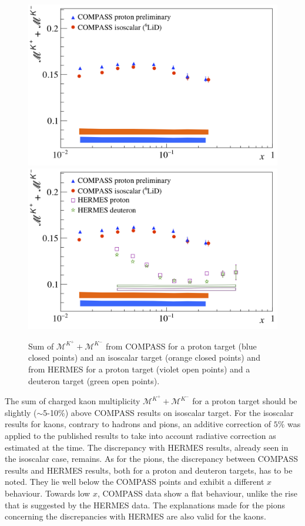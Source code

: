 \begin{figure}[!h]
  \centering
	\includegraphics[scale=0.5]{./gfx/Ks_noH.png}
  \includegraphics[scale=0.5]{./gfx/Ks.png}
  \caption{Sum of $\mathscr{M}^{K^+}+\mathscr{M}^{K^-}$ from COMPASS for a proton target (blue closed points) and an isoscalar target (orange closed points) and from HERMES for a proton target (violet open points) and a deuteron target (green open points).}
  \label{pic:ksum}
\end{figure}

The sum of charged kaon multiplicity $\mathscr{M}^{K^+}+\mathscr{M}^{K^-}$ for a proton target should be slightly ($\sim$5-10\%) above COMPASS results on isoscalar target. For the isoscalar results for kaons, contrary to hadrons and pions, an additive correction of $5\%$ was applied to the published results to take into account radiative correction as estimated at the time. The discrepancy with HERMES results, already seen in the isoscalar case, remains. As for the pions, the discrepancy between COMPASS results and HERMES results, both for a proton and deuteron targets, has to be noted. They lie well below the COMPASS points and exhibit a different $x$ behaviour. Towards low $x$, COMPASS data show a flat behaviour, unlike the rise that is suggested by the HERMES data. The explanations made for the pions concerning the discrepancies with HERMES are also valid for the kaons.

